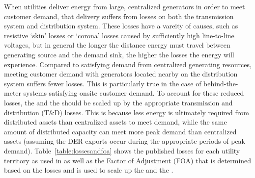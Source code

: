 When utilities deliver energy from large, centralized generators in order to meet customer demand, that delivery suffers from losses on both the transmission system and distribution system. These losses have a vareity of causes, such as resistive `skin' losses or `corona' losses caused by sufficiently high line-to-line voltages, but in general the longer the distance energy must travel between generating source and the demand sink, the higher the losses the energy will experience. Compared to satisfying demand from centralized generating resources, meeting customer demand with generators located nearby on the distribution system suffers fewer losses. This is particularly true in the case of behind-the-meter systems satisfying onsite customer demand. To account for these reduced losses, the \aev{} and the \aciv{} should be scaled up by the appropriate transmission and distribution (T\&D) losses. This is because less energy is ultimately required from distributed assets than centralized assets to meet demand, while the same amount of distributed capacity can meet more peak demand than centralized assets (assuming the DER exports occur during the appropriate periods of peak demand). Table~\ref{table:lossesandfoa} shows the published losses for each utility territory as used in \citet{nyserda_solar_2019} as well as the Factor of Adjustment (FOA) that is determined based on the losses and is used to scale up the \aev{} and the \aciv{}.


